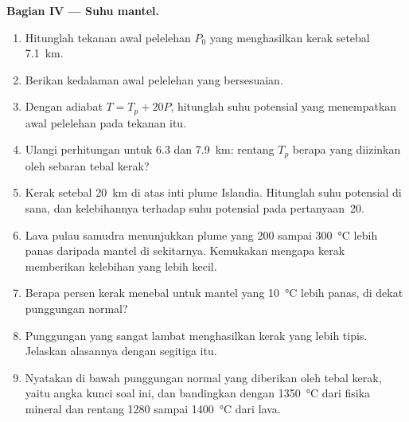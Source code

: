 \begin{problem}
\noindent\textbf{Bagian IV --- Suhu mantel.}
\begin{enumerate}[resume]
\item Hitunglah tekanan awal pelelehan $P_0$ yang menghasilkan kerak setebal \qty{7.1}{km}.
\item Berikan kedalaman awal pelelehan yang bersesuaian.
\item Dengan adiabat $T = T_p + 20P$, hitunglah suhu potensial yang
menempatkan awal pelelehan pada tekanan itu.
\item Ulangi perhitungan untuk 6.3 dan \qty{7.9}{km}: rentang $T_p$ berapa yang
diizinkan oleh sebaran tebal kerak?
\item Kerak setebal \qty{20}{km} di atas inti plume Islandia. Hitunglah
suhu potensial di sana, dan kelebihannya terhadap suhu potensial pada pertanyaan~20.
\item Lava pulau samudra menunjukkan plume yang 200 sampai \qty{300}{\celsius} lebih panas daripada
mantel di sekitarnya. Kemukakan mengapa kerak memberikan kelebihan yang lebih kecil.
\item Berapa persen kerak menebal untuk mantel yang \qty{10}{\celsius}
lebih panas, di dekat punggungan normal?
\item Punggungan yang sangat lambat menghasilkan kerak yang lebih tipis. Jelaskan alasannya dengan segitiga itu.
\item Nyatakan  di bawah punggungan normal yang
diberikan oleh tebal kerak, yaitu angka kunci soal ini, dan bandingkan
dengan \qty{1350}{\celsius} dari fisika mineral dan rentang 1280 sampai
\qty{1400}{\celsius} dari lava.
\end{enumerate}
\end{problem}
